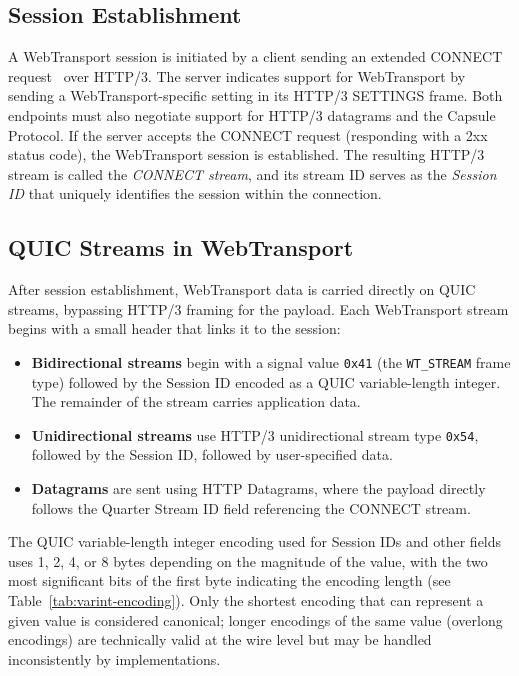 \subsection{Session Establishment}

A WebTransport session is initiated by a client sending an extended CONNECT request~\cite{RFC9220} over HTTP/3. The server indicates support for WebTransport by sending a WebTransport-specific setting in its HTTP/3 SETTINGS frame. Both endpoints must also negotiate support for HTTP/3 datagrams and the Capsule Protocol. If the server accepts the CONNECT request (responding with a 2xx status code), the WebTransport session is established. The resulting HTTP/3 stream is called the \emph{CONNECT stream}, and its stream ID serves as the \emph{Session ID} that uniquely identifies the session within the connection.

\subsection{QUIC Streams in WebTransport}
\label{sec:quic-streams}

After session establishment, WebTransport data is carried directly on QUIC streams, bypassing HTTP/3 framing for the payload. Each WebTransport stream begins with a small header that links it to the session:

\begin{itemize}
    \item \textbf{Bidirectional streams} begin with a signal value \texttt{0x41} (the \texttt{WT\_STREAM} frame type) followed by the Session ID encoded as a QUIC variable-length integer. The remainder of the stream carries application data.
    \item \textbf{Unidirectional streams} use HTTP/3 unidirectional stream type \texttt{0x54}, followed by the Session ID, followed by user-specified data.
    \item \textbf{Datagrams} are sent using HTTP Datagrams, where the payload directly follows the Quarter Stream ID field referencing the CONNECT stream.
\end{itemize}

The QUIC variable-length integer encoding used for Session IDs and other fields uses 1, 2, 4, or 8 bytes depending on the magnitude of the value, with the two most significant bits of the first byte indicating the encoding length (see Table~\ref{tab:varint-encoding}). Only the shortest encoding that can represent a given value is considered canonical; longer encodings of the same value (overlong encodings) are technically valid at the wire level but may be handled inconsistently by implementations.

